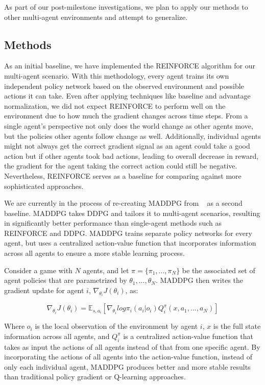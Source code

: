 \documentclass{article}
\begin{document}
As part of our post-milestone investigations, we plan to apply our methods to other multi-agent environments and attempt to generalize.

\subsection{Methods}
As an initial baseline, we have implemented the REINFORCE algorithm for our multi-agent scenario. With this methodology, every agent trains its own independent policy network based on the observed environment and possible actions it can take. Even after applying techniques like baseline and advantage normalization, we did not expect REINFORCE to perform well on the environment due to how much the gradient changes across time steps. From a single agent's perspective not only does the world change as other agents move, but the policies other agents follow change as well. Additionally, individual agents might not always get the correct gradient signal as an agent could take a good action but if other agents took bad actions, leading to overall decrease in reward, the gradient for the agent taking the correct action could still be negative. Nevertheless, REINFORCE serves as a baseline for comparing against more sophisticated approaches.

We are currently in the process of re-creating MADDPG from ~\cite{maddpg} as a second baseline. MADDPG takes DDPG and tailors it to multi-agent scenarios, resulting in significantly better performance than single-agent methods such as REINFORCE and DDPG. MADDPG trains separate policy networks for every agent, but uses a centralized action-value function that incorporates information across all agents to ensure a more stable learning process. 

Consider a game with $N$ agents, and let $\pi = \{\pi_1, ..., \pi_N\}$ be the associated set of agent policies that are parametrized by $\theta_1, ..., \theta_N$. MADDPG then writes the gradient update for agent $i$, $\nabla_{\theta_i} J(\theta_i)$, as:

$$\nabla_{\theta_i}J(\theta_i) = \mathbb{E}_{s, a_i}[\nabla_{\theta_i}log \pi_i(a_i|o_i)Q^{\pi}_i(x, a_1, ..., a_N)]$$

Where $o_i$ is the local observation of the environment by agent $i$, $x$ is the full state information across all agents, and $Q^{\pi}_i$ is a centralized action-value function that takes as input the actions of all agents instead of that from one specific agent. By incorporating the actions of all agents into the action-value function, instead of only each individual agent, MADDPG produces better and more stable results than traditional policy gradient or Q-learning approaches.
\end{document}
